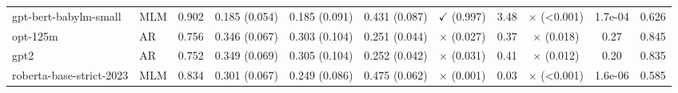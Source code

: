 \begin{table}[t]
\begin{adjustbox}{max width=\textwidth}
\begin{tabular}{llccccccccc}
gpt-bert-babylm-small & MLM & 0.902 & 0.185 (0.054) & 0.185 (0.091) & 0.431 (0.087) & $\checkmark$ (0.997) & 3.48 & $\times$ (<0.001) & 1.7e-04 & 0.626 \\
opt-125m & AR & 0.756 & 0.346 (0.067) & 0.303 (0.104) & 0.251 (0.044) & $\times$ (0.027) & 0.37 & $\times$ (0.018) & 0.27 & 0.845 \\
gpt2 & AR & 0.752 & 0.349 (0.069) & 0.305 (0.104) & 0.252 (0.042) & $\times$ (0.031) & 0.41 & $\times$ (0.012) & 0.20 & 0.835 \\
roberta-base-strict-2023 & MLM & 0.834 & 0.301 (0.067) & 0.249 (0.086) & 0.475 (0.062) & $\times$ (0.001) & 0.03 & $\times$ (<0.001) & 1.6e-06 & 0.585 \\
\bottomrule
\end{tabular}
\end{adjustbox}
\end{table}
